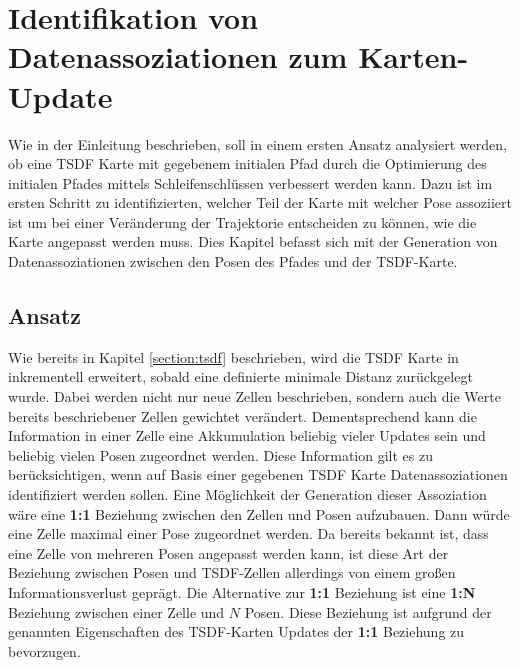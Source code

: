 \chapter{Identifikation von Datenassoziationen zum Karten-Update}\label{chapter:association}

Wie in der Einleitung beschrieben, soll in einem ersten Ansatz analysiert werden, ob eine TSDF Karte mit gegebenem initialen Pfad durch die Optimierung des initialen Pfades mittels Schleifenschlüssen verbessert werden kann. Dazu ist im ersten Schritt zu identifizierten, welcher Teil der Karte mit welcher Pose assoziiert ist um bei einer Veränderung der Trajektorie entscheiden zu können, wie die Karte angepasst werden muss. Dies Kapitel befasst sich mit der Generation von Datenassoziationen zwischen den Posen des Pfades und der TSDF-Karte.

\section{Ansatz}
\label{section:ansatz}

Wie bereits in Kapitel \ref{section:tsdf} beschrieben, wird die TSDF Karte in \cite{HATSDF} inkrementell erweitert, sobald eine definierte minimale Distanz zurückgelegt wurde. Dabei werden nicht nur neue Zellen beschrieben, sondern auch die Werte bereits beschriebener Zellen gewichtet verändert. Dementsprechend kann die Information in einer Zelle eine Akkumulation beliebig vieler Updates sein und beliebig vielen Posen zugeordnet werden. Diese Information gilt es zu berücksichtigen, wenn auf Basis einer gegebenen TSDF Karte Datenassoziationen identifiziert werden sollen.
Eine Möglichkeit der Generation dieser Assoziation wäre eine \textbf{1:1} Beziehung zwischen den Zellen und Posen aufzubauen. Dann würde eine Zelle maximal einer Pose zugeordnet werden. Da bereits bekannt ist, dass eine Zelle von mehreren Posen angepasst werden kann, ist diese Art der Beziehung zwischen Posen und TSDF-Zellen allerdings von einem großen Informationsverlust geprägt. Die Alternative zur \textbf{1:1} Beziehung ist eine \textbf{1:N} Beziehung zwischen einer Zelle und $N$ Posen. Diese Beziehung ist aufgrund der genannten Eigenschaften des TSDF-Karten Updates der \textbf{1:1} Beziehung zu bevorzugen.

